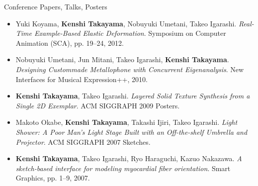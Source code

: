 {\Large\sc Conference Papers, Talks, Posters}
\vspace{-3mm}
\begin{itemize}
\item Yuki Koyama, {\bf Kenshi Takayama}, Nobuyuki Umetani, Takeo Igarashi. {\it Real-Time Example-Based Elastic Deformation}. Symposium on Computer Animation (SCA), pp. 19--24, 2012.

\item Nobuyuki Umetani, Jun Mitani, Takeo Igarashi, {\bf Kenshi Takayama}. {\it Designing Custommade Metallophone with Concurrent Eigenanalysis}. New Interfaces for Musical Expression++, 2010.

\item {\bf Kenshi Takayama}, Takeo Igarashi. {\it Layered Solid Texture Synthesis from a Single 2D Exemplar}. ACM SIGGRAPH 2009 Posters.

\item Makoto Okabe, {\bf Kenshi Takayama}, Takashi Ijiri, Takeo Igarashi. {\it Light Shower: A Poor Man's Light Stage Built with an Off-the-shelf Umbrella and Projector}. ACM SIGGRAPH 2007 Sketches.

\item {\bf Kenshi Takayama}, Takeo Igarashi, Ryo Haraguchi, Kazuo Nakazawa. {\it A sketch-based interface for modeling myocardial fiber orientation}. Smart Graphics, pp. 1--9, 2007.

\end{itemize}

